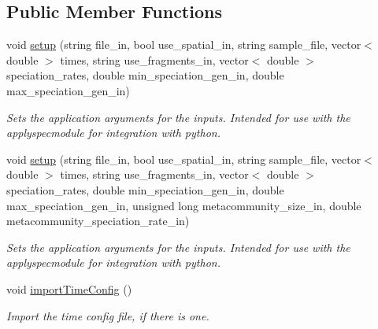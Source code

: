 \subsection*{Public Member Functions}
\begin{DoxyCompactItemize}
\item 
void \hyperlink{struct_spec_sim_parameters_a8dfb82b7d5e4927a81383f55c2bd8175}{setup} (string file\+\_\+in, bool use\+\_\+spatial\+\_\+in, string sample\+\_\+file, vector$<$ double $>$ times, string use\+\_\+fragments\+\_\+in, vector$<$ double $>$ speciation\+\_\+rates, double min\+\_\+speciation\+\_\+gen\+\_\+in, double max\+\_\+speciation\+\_\+gen\+\_\+in)
\begin{DoxyCompactList}\small\item\em Sets the application arguments for the inputs. Intended for use with the applyspecmodule for integration with python. \end{DoxyCompactList}\item 
void \hyperlink{struct_spec_sim_parameters_af203c1f89e195c31da558659ba890ce1}{setup} (string file\+\_\+in, bool use\+\_\+spatial\+\_\+in, string sample\+\_\+file, vector$<$ double $>$ times, string use\+\_\+fragments\+\_\+in, vector$<$ double $>$ speciation\+\_\+rates, double min\+\_\+speciation\+\_\+gen\+\_\+in, double max\+\_\+speciation\+\_\+gen\+\_\+in, unsigned long metacommunity\+\_\+size\+\_\+in, double metacommunity\+\_\+speciation\+\_\+rate\+\_\+in)
\begin{DoxyCompactList}\small\item\em Sets the application arguments for the inputs. Intended for use with the applyspecmodule for integration with python. \end{DoxyCompactList}\item 
void \hyperlink{struct_spec_sim_parameters_ae0196a50a551a821b75b6e92a35534a7}{import\+Time\+Config} ()\hypertarget{struct_spec_sim_parameters_ae0196a50a551a821b75b6e92a35534a7}{}\label{struct_spec_sim_parameters_ae0196a50a551a821b75b6e92a35534a7}

\begin{DoxyCompactList}\small\item\em Import the time config file, if there is one. \end{DoxyCompactList}\end{DoxyCompactItemize}
